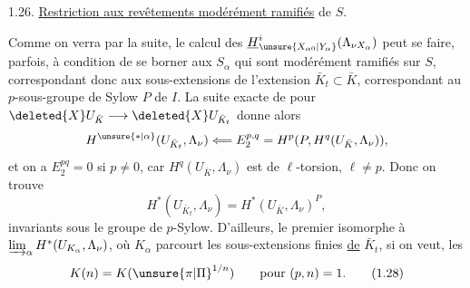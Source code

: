 
1.26. \uline{Restriction aux revêtements modérément ramifiés} de $S$.

Comme on verra par la suite, le calcul des $\underline H^i_{\unsure{X_{\alpha0}|Y_\alpha}}(\Lambda_{\nu X_\alpha})$ peut se faire, parfois, à condition de se borner aux $S_\alpha$ qui sont modérément ramifiés sur $S$, correspondant donc aux  sous-extensions  de l'extension $\bar K_t\subset\bar K$,  correspondant au $p$-sous-groupe de Sylow $P$ de $I$.    La suite exacte de  pour $\deleted{X}U_{\bar K}\longrightarrow\deleted{X}U_{\bar K_t}$  donne alors
\[
H^{\unsure{*|\alpha}}(U_{\bar K_t},\Lambda_\nu)\Longleftarrow E_2^{p,q}=H^p(P,H^q(U_{\bar K},\Lambda_\nu)),
\]
et on a $E_2^{pq}=0$ si $p\ne0$, car $H^q(U_{\bar K},\Lambda_\nu)$ est de $\ell$-torsion, $\ell\ne p$. Donc on trouve
\[
H^*(U_{\bar K_t},\Lambda_\nu)=H^*(U_{\bar K},\Lambda_\nu)^P,
\tag*{(1.27)}
\]
invariants sous le groupe de $p$-Sylow. D'ailleurs, le premier  isomorphe à $\varinjlim_\alpha H^*(U_{K_\alpha},\Lambda_\nu)$, où $K_\alpha$ parcourt les sous-extensions finies \uline{de} $\bar K_t$,   si on veut, les
\[
K(n)=K({\unsure{\pi|\Pi}}^{1/n})\qquad\text{pour }(p,n)=1.
\tag*{(1.28)}
\]
